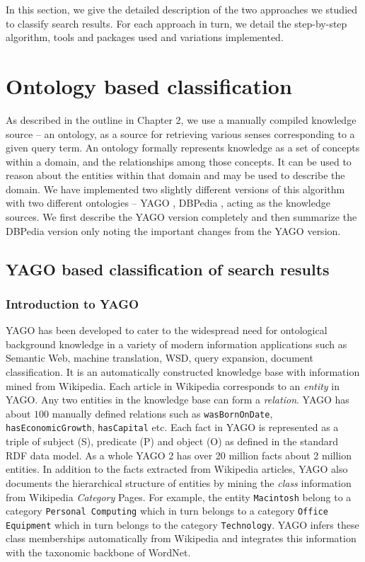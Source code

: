 \documentclass[a4paper,12pt]{report}
\begin{document}
In this section, we give the detailed description of the two
approaches we studied to classify search results. For each approach in
turn, we detail the step-by-step algorithm, tools and packages used
and variations implemented. 

\section{Ontology based classification}
As described in the outline in Chapter 2, we use a manually compiled
knowledge source -- an ontology, as a source for retrieving various
senses corresponding to a given query term. An ontology formally
represents knowledge as a set of concepts within a domain, and the
relationships among those concepts. It can be used to reason about the
entities within that domain and may be used to describe the domain. We
have implemented two slightly different versions of this algorithm
with two different ontologies -- YAGO \cite{yago}, DBPedia \cite{dbpedia},
acting as the knowledge sources. We first describe the YAGO version
completely and then summarize the DBPedia version only noting the
important changes from the YAGO version.

\subsection{YAGO based classification of search results}
\subsubsection{Introduction to YAGO}
YAGO has been developed to cater to the widespread need for
ontological background knowledge in a variety of modern information
applications such as Semantic Web, machine translation, WSD, query
expansion, document classification. It is an automatically constructed
knowledge base with information mined from Wikipedia. Each article in
Wikipedia corresponds to an {\it entity} in YAGO. Any two entities in
the knowledge base can form a {\it relation}. YAGO has about $100$
manually defined relations such as {\tt wasBornOnDate}, {\tt
  hasEconomicGrowth}, {\tt hasCapital} etc. Each fact in YAGO is
represented as a triple of subject (S), predicate (P) and object (O)
as defined in the standard RDF data model. As a whole YAGO 2 has over
20 million facts about 2 million entities. In addition to the facts
extracted from Wikipedia articles, YAGO also documents the
hierarchical structure of entities by mining the {\it class}
information from Wikipedia {\it Category} Pages. For example, the
entity {\tt Macintosh} belong to a category {\tt Personal Computing}
which in turn belongs to a category {\tt Office Equipment} which in
turn belongs to the category {\tt Technology}. YAGO infers these class
memberships automatically from Wikipedia and integrates this
information with the taxonomic backbone of WordNet. 
\end{document}
